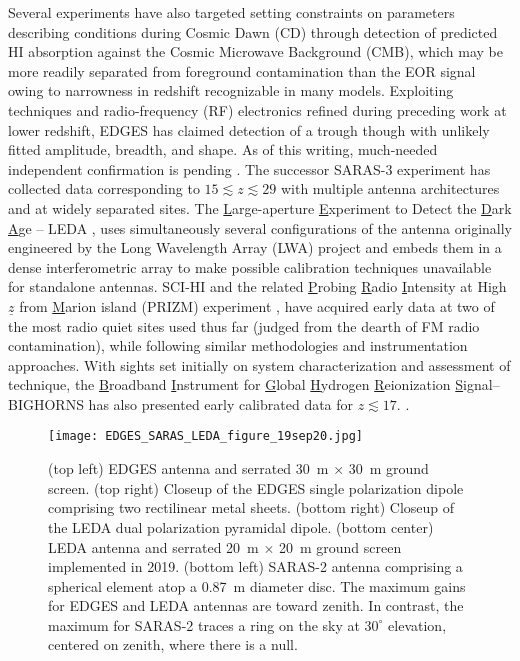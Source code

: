 Several experiments have also targeted setting constraints on parameters describing conditions during Cosmic Dawn (CD) through detection of predicted HI absorption against the Cosmic Microwave Background (CMB), which may be more readily separated from foreground contamination than the EOR signal owing to narrowness in redshift recognizable in many models.  Exploiting techniques and radio-frequency (RF) electronics refined during  preceding work at lower redshift, EDGES has claimed detection of a trough \cite{bowman18} though with unlikely fitted amplitude, breadth, and shape.  As of this writing, much-needed independent confirmation is pending \cite{greenhill18,hills18,bradley19,spinelli19}.  The successor SARAS-3 experiment has collected data corresponding to $15\lesssim z \lesssim 29$ with multiple antenna architectures and at widely separated sites.  The {\underline L}arge-aperture {\underline E}xperiment to Detect the {\underline D}ark {\underline A}ge -- LEDA \cite{greenhill12,price18}, uses simultaneously several configurations of the antenna originally engineered by the Long Wavelength Array (LWA) project \cite{taylor12} and embeds them in a dense interferometric array to make possible calibration techniques unavailable for standalone antennas.  SCI-HI \cite{voytek14} and  the related {\underline P}robing {\underline R}adio {\underline I}ntensity at High ${\underline z}$ from {\underline M}arion island (PRIZM) experiment \cite{philip19}, have acquired early data at two of the most radio quiet sites used thus far (judged from the dearth of FM radio contamination), while following similar methodologies and instrumentation approaches.  With sights set initially on system characterization and assessment of technique, the {\underline B}roadband {\underline I}nstrument for {\underline G}lobal {\underline H}ydrogen {\underline R}eionization {\underline S}ignal--BIGHORNS has also presented  early calibrated data for $z\lesssim 17$. \cite{sokolowski15}. 


\begin{figure}[htb]
\begin{center}
\hspace*{-0.15in}\texttt{[image: EDGES\_SARAS\_LEDA\_figure\_19sep20.jpg]}
\end{center}
\caption{(top left) EDGES antenna and serrated 30~m $\times$ 30~m ground screen.  (top right) Closeup of the EDGES single polarization dipole comprising two rectilinear metal sheets.  (bottom right) Closeup of the LEDA dual polarization pyramidal dipole.  (bottom center) LEDA antenna and serrated 20~m $\times$ 20~m ground screen implemented in 2019. (bottom left) SARAS-2 antenna comprising a spherical element atop a 0.87~m diameter disc.  The maximum gains for EDGES and LEDA antennas are toward zenith.  In contrast, the maximum for SARAS-2 traces a ring on the sky at $30^\circ$ elevation, centered on zenith, where there is a null.}
\end{figure}

